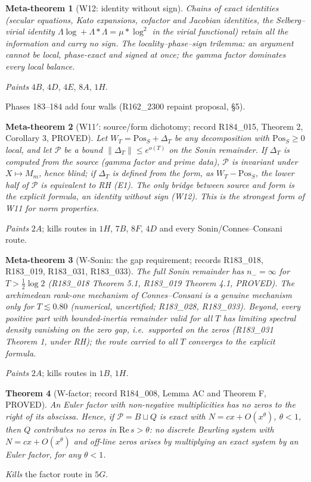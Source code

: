 \documentclass[11pt]{amsart}
\newtheorem{theorem}{Theorem}[section]
\newtheorem{metatheorem}[theorem]{Meta-theorem}
\theoremstyle{definition}
\theoremstyle{remark}
\newcommand{\Rel}{\mathrm{Re}\,}
\begin{document}
\begin{metatheorem}[W12: identity without sign]\label{W12}
Chains of exact identities (secular equations, Kato expansions, cofactor and Jacobian identities, the
Selberg--virial identity $\Lambda\log+\Lambda*\Lambda=\mu*\log^2$ in the virial functional) retain all the
information and carry no sign. The locality--phase--sign trilemma: an argument cannot be local, phase-exact
and signed at once; the gamma factor dominates every local balance.
\end{metatheorem}
\noindent \emph{Paints} $4B$, $4D$, $4E$, $8A$, $1H$.

\noindent Phases 183--184 add four walls (R162\_2300 repaint proposal, \S5).

\begin{metatheorem}[W11$'$: source/form dichotomy; record R184\_015, Theorem 2, Corollary 3, PROVED]\label{W11prime}
Let $W_T=\mathrm{Pos}_S+\Delta_T$ be any decomposition with $\mathrm{Pos}_S\ge0$ local, and let $\mathscr P$ be a bound
$\|\Delta_T\|\le e^{o(T)}$ on the Sonin remainder. If $\Delta_T$ is computed from the source (gamma factor and prime data), $\mathscr P$
is invariant under $X\mapsto M_m$, hence blind; if $\Delta_T$ is defined from the form, as $W_T-\mathrm{Pos}_S$, the lower half of
$\mathscr P$ is equivalent to RH (E1). The only bridge between source and form is the explicit formula, an identity without sign
(W12). This is the strongest form of W11 for norm properties.
\end{metatheorem}
\noindent \emph{Paints} $2A$; kills routes in $1H$, $7B$, $8F$, $4D$ and every Sonin/Connes--Consani route.

\begin{metatheorem}[W-Sonin: the gap requirement; records R183\_018, R183\_019, R183\_031, R183\_033]\label{WSonin}
The full Sonin remainder has $n_-=\infty$ for $T>\frac12\log2$ (R183\_018 Theorem 5.1, R183\_019 Theorem 4.1, PROVED). The
archimedean rank-one mechanism of Connes--Consani is a genuine mechanism only for $T\lesssim0.80$ (numerical, uncertified;
R183\_028, R183\_033). Beyond, every positive part with bounded-inertia remainder valid for all $T$ has limiting spectral density
vanishing on the zero gap, i.e.\ supported on the zeros (R183\_031 Theorem 1, under RH); the route carried to all $T$ converges to
the explicit formula.
\end{metatheorem}
\noindent \emph{Paints} $2A$; kills routes in $1B$, $1H$.

\begin{theorem}[W-factor; record R184\_008, Lemma AC and Theorem F, PROVED]\label{Wfactor}
An Euler factor with non-negative multiplicities has no zeros to the right of its abscissa. Hence, if $\mathcal P=B\sqcup Q$ is
exact with $N=cx+O(x^\theta)$, $\theta<1$, then $Q$ contributes no zeros in $\Rel s>\theta$: no discrete Beurling system with
$N=cx+O(x^\theta)$ and off-line zeros arises by multiplying an exact system by an Euler factor, for any $\theta<1$.
\end{theorem}
\noindent \emph{Kills} the factor route in $5G$.
\end{document}
